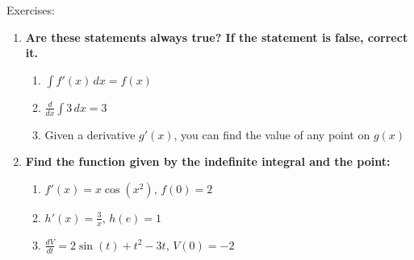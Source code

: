 \documentclass[../revisedmain.tex]{subfiles}
\begin{document}
	\begin{center}
		\LARGE Exercises:
	\end{center}
	\begin{enumerate}
		\item \textbf{Are these statements always true? If the statement is false, correct it.}
		\begin{enumerate}
			\item $\int f'(x)\, dx = f(x)$
			\item $\frac{d}{dx}\int 3\,dx = 3$
			\item Given a derivative $g'(x)$, you can find the value of any point on $g(x)$
		\end{enumerate}
		\item \textbf{Find the function given by the indefinite integral and the point:}
		\begin{enumerate}
			\item $f'(x)=x\cos(x^2)$, $f(0)=2$
			\item $h'(x)=\frac{3}{x}$, $h(e)=1$
			\item $\frac{dV}{dt}=2\sin(t)+t^2-3t$, $V(0)=-2$
		\end{enumerate}
	\end{enumerate}
\end{document}
